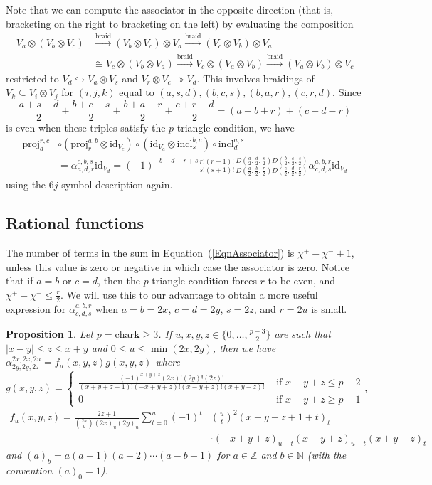 \documentclass[11pt,a4paper,reqno]{amsart}
\newtheorem{prop}[theorem]{Proposition}
\theoremstyle{definition}
\newcommand{\bk}{\mathbf{k}}
\numberwithin{equation}{section}
\newcommand{\braid}{\mathrm{braid}}
\newcommand{\charr}{\mathrm{char}}
\newcommand{\mN}{\mathbb{N}}
\newcommand{\mZ}{\mathbb{Z}}
\newcommand{\id}{\mathrm{id}}
\newcommand{\incl}{\mathrm{incl}}
\newcommand{\proj}{\mathrm{proj}}
\begin{document}
Note that we can compute the associator in the opposite direction (that is, bracketing on the right to bracketing on the left) by evaluating the composition
\[\begin{split}
V_a\otimes (V_b\otimes V_c)&\xrightarrow{\braid}(V_b\otimes V_c)\otimes V_a\xrightarrow{\braid}(V_c\otimes V_b)\otimes V_a\\
&\cong V_c\otimes(V_b\otimes V_a)\xrightarrow{\braid}V_c\otimes(V_a\otimes V_b)\xrightarrow{\braid}(V_a\otimes V_b)\otimes V_c
\end{split}\]
restricted to $V_d\hookrightarrow V_a\otimes V_s$ and $V_r\otimes V_c\twoheadrightarrow V_d$. This involves braidings of $V_k\subseteq V_i\otimes V_j$ for $(i,j,k)$ equal to $(a,s,d),(b,c,s),(b,a,r),(c,r,d)$. Since
\[\frac{a+s-d}2+\frac{b+c-s}2+\frac{b+a-r}2+\frac{c+r-d}2=(a+b+r)+(c-d-r)\]
is even when these triples satisfy the $p$-triangle condition, we have
\begin{equation}\label{EqnRightLeft}
\begin{split}
\proj_d^{r,c}&\circ(\proj_r^{a,b}\otimes\id_{V_c})\circ(\id_{V_a}\otimes\incl_s^{b,c})\circ\incl_d^{a,s}\\
&=\alpha^{c,b,s}_{a,d,r}\id_{V_d}=(-1)^{-b+d-r+s}\frac{r!(r+1)!}{s!(s+1)!}\frac{D(\frac a2,\frac d2,\frac s2)D(\frac b2,\frac c2,\frac s2)}{D(\frac a2,\frac b2,\frac r2)D(\frac c2,\frac d2,\frac r2)}\alpha^{a,b,r}_{c,d,s}\id_{V_d}
\end{split}
\end{equation}
using the $6j$-symbol description again.

\subsection{Rational functions}\label{SecRational} The number of terms in the sum in Equation~(\ref{EqnAssociator}) is $\chi^+-\chi^-+1$, unless this value is zero or negative in which case the associator is zero. Notice that if $a=b$ or $c=d$, then the $p$-triangle condition forces $r$ to be even, and $\chi^+-\chi^-\leq\frac r2$. We will use this to our advantage to obtain a more useful expression for $\alpha^{a,b,r}_{c,d,s}$ when $a=b=2x$, $c=d=2y$, $s=2z$, and $r=2u$ is small.

\begin{prop}\label{PropRational}
Let $p=\charr\bk\geq3$. If $u,x,y,z\in\{0,\dots,\frac{p-3}2\}$ are such that $|x-y|\leq z\leq x+y$ and $0\leq u\leq\min(2x,2y)$, then we have $\alpha^{2x,2x,2u}_{2y,2y,2z}=f_u(x,y,z)g(x,y,z)$
where
\[g(x,y,z)=\begin{cases}\frac{(-1)^{x+y+z}(2x)!(2y)!(2z)!}{(x+y+z+1)!(-x+y+z)!(x-y+z)!(x+y-z)!}&\text{ if }x+y+z\leq p-2\\0&\text{ if }x+y+z\geq p-1\end{cases},\]
\[\begin{split}f_u(x,y,z)=\frac{2z+1}{\binom{2u}{u}(2x)_u(2y)_u}\sum_{t=0}^u(-1)^t&\binom{u}{t}^2(x+y+z+1+t)_t\\
&\cdot(-x+y+z)_{u-t}(x-y+z)_{u-t}(x+y-z)_t\end{split}\]
and $(a)_b=a(a-1)(a-2)\cdots(a-b+1)$ for $a\in\mZ$ and $b\in\mN$ (with the convention $(a)_0=1$).
\end{prop}
\end{document}
